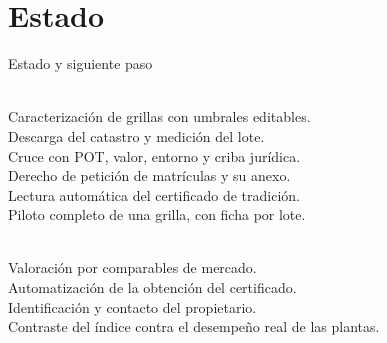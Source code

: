\documentclass[aspectratio=169, 11pt]{beamer}
\begin{document}
\section{Estado}

%
\begin{frame}{Estado y siguiente paso}
  \vspace{0.1em}
  \begin{minipage}[t]{0.47\textwidth}
    \raggedright
    \\[0.6em]{\footnotesize\textcolor{tinta2}{Caracterización de grillas con umbrales editables.\\[0.20em]
    Descarga del catastro y medición del lote.\\[0.20em]
    Cruce con POT, valor, entorno y criba jurídica.\\[0.20em]
    Derecho de petición de matrículas y su anexo.\\[0.20em]
    Lectura automática del certificado de tradición.\\[0.20em]
    Piloto completo de una grilla, con ficha por lote.}}
  \end{minipage}\hfill
  \begin{minipage}[t]{0.47\textwidth}
    \raggedright
    \\[0.6em]{\footnotesize\textcolor{tinta2}{Valoración por comparables de mercado.\\[0.20em]
    Automatización de la obtención del certificado.\\[0.20em]
    Identificación y contacto del propietario.\\[0.20em]
    Contraste del índice contra el desempeño real de las plantas.}}
  \end{minipage}


\end{frame}
\end{document}
